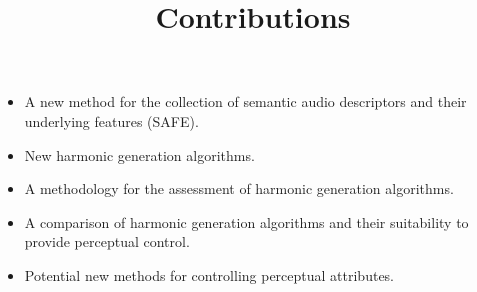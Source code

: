 \documentclass[a4paper]{article}
\title{Contributions}
\author{}
\date{}
\begin{document}
\maketitle

	\begin{itemize}
		\item A new method for the collection of semantic audio descriptors and their underlying features (SAFE).
		\item New harmonic generation algorithms.
		\item A methodology for the assessment of harmonic generation algorithms.
		\item A comparison of harmonic generation algorithms and their suitability to provide perceptual control.
		\item Potential new methods for controlling perceptual attributes.
	\end{itemize}
\end{document}
